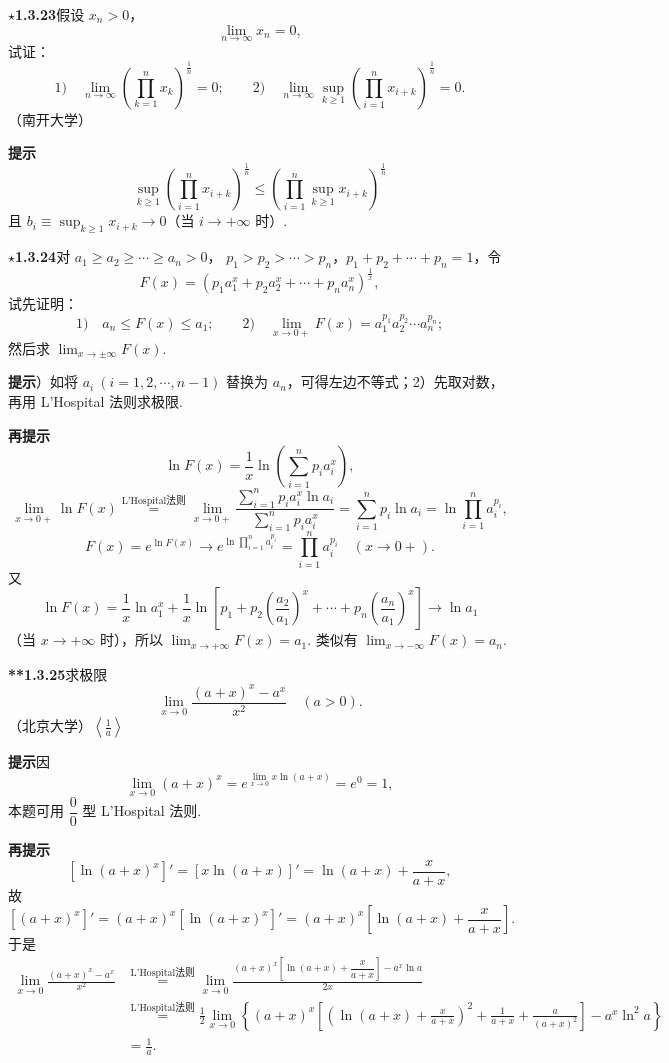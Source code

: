 \documentclass[UTF8, 12pt, fontset=fandol, oneside]{ctexart}
\begin{document}
\noindent\textbf{$\star$1.3.23}\quad 假设 $x_n>0$，
\[
  \lim_{n\to\infty}x_n=0,
\]
试证：
\[
  1)\quad \lim_{n\to\infty}\left(\prod_{k=1}^n x_k\right)^{\frac1n}=0;
  \qquad
  2)\quad \lim_{n\to\infty}\sup_{k\ge1}\left(\prod_{i=1}^n x_{i+k}\right)^{\frac1n}=0.
\]
（南开大学）

\noindent\textbf{提示}\quad
\[
  \sup_{k\ge1}\left(\prod_{i=1}^n x_{i+k}\right)^{\frac1n}
  \le
  \left(\prod_{i=1}^n\sup_{k\ge1}x_{i+k}\right)^{\frac1n}
\]
且 $b_i\equiv\sup_{k\ge1}x_{i+k}\to0$（当 $i\to+\infty$ 时）.

\noindent\textbf{$\star$1.3.24}\quad 对 $a_1\ge a_2\ge\cdots\ge a_n>0$，
$p_1>p_2>\cdots>p_n$，$p_1+p_2+\cdots+p_n=1$，令
\[
  F(x)=\left(p_1a_1^x+p_2a_2^x+\cdots+p_na_n^x\right)^{\frac1x},
\]
试先证明：
\[
  1)\quad a_n\le F(x)\le a_1;\qquad
  2)\quad \lim_{x\to0+}F(x)=a_1^{p_1}a_2^{p_2}\cdots a_n^{p_n};
\]
然后求 $\displaystyle\lim_{x\to\pm\infty}F(x)$.

\noindent\textbf{提示}）如将 $a_i\ (i=1,2,\cdots,n-1)$ 替换为 $a_n$，可得左边不等式；2）先取对数，再用 L'Hospital 法则求极限.

\noindent\textbf{再提示}\quad
\[
  \ln F(x)=\frac1x\ln\left(\sum_{i=1}^np_ia_i^x\right),
\]
\[
  \lim_{x\to0+}\ln F(x)
  \overset{\text{L'Hospital法则}}{=}
  \lim_{x\to0+}\frac{\sum_{i=1}^np_ia_i^x\ln a_i}{\sum_{i=1}^np_ia_i^x}
  =\sum_{i=1}^np_i\ln a_i=\ln\prod_{i=1}^na_i^{p_i},
\]
\[
  F(x)=e^{\ln F(x)}\to e^{\ln\prod_{i=1}^na_i^{p_i}}
  =\prod_{i=1}^na_i^{p_i}\quad(x\to0+).
\]
又
\[
  \ln F(x)=\frac1x\ln a_1^x+\frac1x
  \ln\left[p_1+p_2\left(\frac{a_2}{a_1}\right)^x+\cdots+
  p_n\left(\frac{a_n}{a_1}\right)^x\right]\to\ln a_1
\]
（当 $x\to+\infty$ 时），所以 $\displaystyle\lim_{x\to+\infty}F(x)=a_1$.
类似有 $\displaystyle\lim_{x\to-\infty}F(x)=a_n$.

\noindent\textbf{**1.3.25}\quad 求极限
\[
  \lim_{x\to0}\frac{(a+x)^x-a^x}{x^2}\quad(a>0).
\]
（北京大学）\quad $\left\langle\frac1a\right\rangle$

\noindent\textbf{提示}\quad 因
\[
  \lim_{x\to0}(a+x)^x=e^{\lim_{x\to0}x\ln(a+x)}=e^0=1,
\]
本题可用 $\dfrac00$ 型 L'Hospital 法则.

\noindent\textbf{再提示}\quad
\[
  [\ln(a+x)^x]'=[x\ln(a+x)]'=\ln(a+x)+\frac{x}{a+x},
\]
故
\[
  [(a+x)^x]'=(a+x)^x[\ln(a+x)^x]'
  =(a+x)^x\left[\ln(a+x)+\frac{x}{a+x}\right].
\]
于是
\[
\begin{aligned}
  \lim_{x\to0}\frac{(a+x)^x-a^x}{x^2}
  &\overset{\text{L'Hospital法则}}{=}
  \lim_{x\to0}
  \frac{(a+x)^x\left[\ln(a+x)+\dfrac{x}{a+x}\right]-a^x\ln a}{2x}\\
  &\overset{\text{L'Hospital法则}}{=}
  \frac12\lim_{x\to0}\left\{
  (a+x)^x\left[\left(\ln(a+x)+\frac{x}{a+x}\right)^2
  +\frac1{a+x}+\frac a{(a+x)^2}\right]
  -a^x\ln^2a\right\}\\
  &=\frac1a.
\end{aligned}
\]
\end{document}
